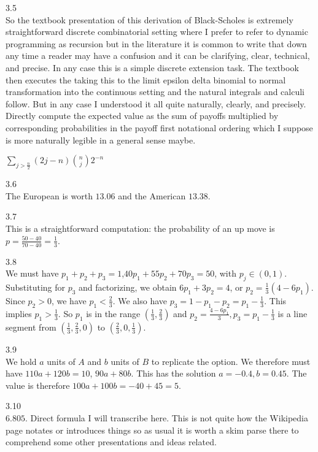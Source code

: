 3.5 \\
So the textbook presentation of this derivation of Black-Scholes is extremely straightforward discrete combinatorial setting where I prefer to refer to dynamic programming as recursion but in the literature it is common to write that down any time a reader may have a confusion and it can be clarifying, clear, technical, and precise. In any case this is a simple discrete extension task. The textbook then executes the taking this to the limit epsilon delta binomial to normal transformation into the continuous setting and the natural integrals and calculi follow. But in any case I understood it all quite naturally, clearly, and precisely. Directly compute the expected value as the sum of payoffs multiplied by corresponding probabilities in the payoff first notational ordering which I suppose is more naturally legible in a general sense maybe.

$\boxed{\sum_{j>\frac{n}{2}} (2j-n) \binom{n}{j} 2^{-n}}$

3.6 \\
The European is worth $\boxed{13.06}$ and the American $\boxed{13.38}$.

3.7 \\
This is a straightforward computation: the probability of an up move is $p=\frac{50-40}{70-40}=\boxed{\frac{1}{3}}$.

3.8 \\
We must have $p_1 + p_2 + p_3 = 1$,$40 p_1 + 55 p_2 + 70 p_3 = 50$, with $p_j \in (0,1)$. Substituting for $p_3$ and factorizing, we obtain $6 p_1 + 3 p_2 = 4$, or $p_2 = \frac{1}{3} (4 - 6p_1)$. Since $p_2 > 0$, we have $p_1 < \frac{2}{3}$. We also have $p_3 = 1-p_1-p_2 = p_1-\frac{1}{3}$. This implies $p_1 > \frac{1}{3}$. So $p_1$ is in the range $\boxed{ \left( \frac{1}{3},\frac{2}{3} \right) }$ and $p_2=\frac{4-6 p_1}{3} , p_3 = p_1 - \frac{1}{3}$ is a line segment from $\left( \frac{1}{3},\frac{2}{3},0 \right)$ to $\left( \frac{2}{3},0,\frac{1}{3} \right)$.

3.9 \\
We hold $a$ units of $A$ and $b$ units of $B$ to replicate the option. We therefore must have $110a+120b=10$, $90a+80b$. This has the solution $a=-0.4,b=0.45$. The value is therefore $100a+100b=-40+45=\boxed{5}$.

3.10 \\
$\boxed{6.805}$. Direct formula I will transcribe here. This is not quite how the Wikipedia page notates or introduces things so as usual it is worth a skim parse there to comprehend some other presentations and ideas related.

